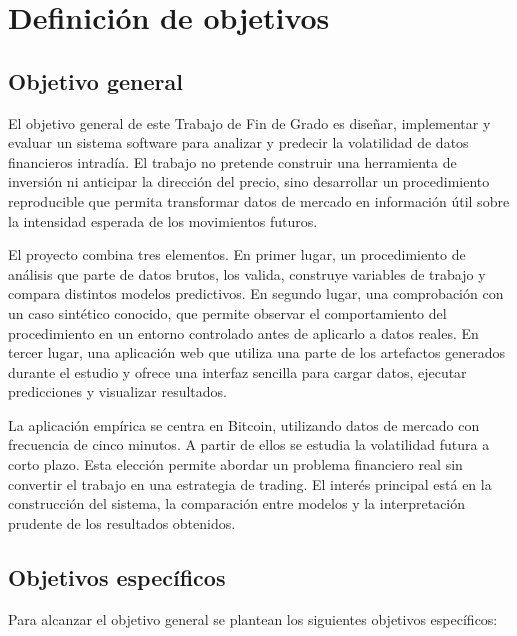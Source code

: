 
\chapter{Definición de objetivos}\label{cap:objetivos}

\section{Objetivo general}\label{sec:objetivo-general}

El objetivo general de este Trabajo de Fin de Grado es diseñar, implementar y evaluar un sistema software para analizar y predecir la volatilidad de datos financieros intradía. El trabajo no pretende construir una herramienta de inversión ni anticipar la dirección del precio, sino desarrollar un procedimiento reproducible que permita transformar datos de mercado en información útil sobre la intensidad esperada de los movimientos futuros.

El proyecto combina tres elementos. En primer lugar, un procedimiento de análisis que parte de datos brutos, los valida, construye variables de trabajo y compara distintos modelos predictivos. En segundo lugar, una comprobación con un caso sintético conocido, que permite observar el comportamiento del procedimiento en un entorno controlado antes de aplicarlo a datos reales. En tercer lugar, una aplicación web que utiliza una parte de los artefactos generados durante el estudio y ofrece una interfaz sencilla para cargar datos, ejecutar predicciones y visualizar resultados.

La aplicación empírica se centra en Bitcoin, utilizando datos de mercado con frecuencia de cinco minutos. A partir de ellos se estudia la volatilidad futura a corto plazo. Esta elección permite abordar un problema financiero real sin convertir el trabajo en una estrategia de trading. El interés principal está en la construcción del sistema, la comparación entre modelos y la interpretación prudente de los resultados obtenidos.

\section{Objetivos específicos}\label{sec:objetivos-especificos}

Para alcanzar el objetivo general se plantean los siguientes objetivos específicos:

